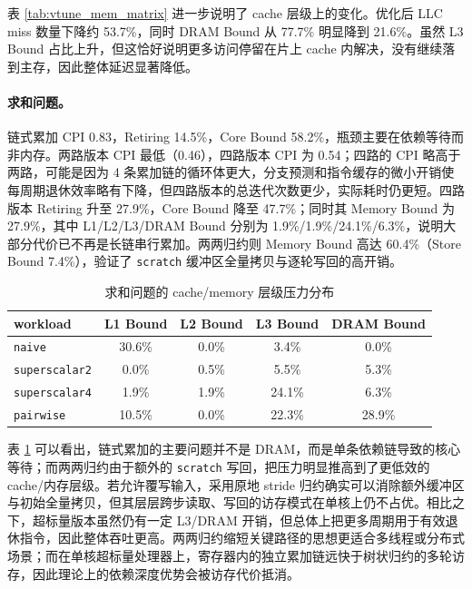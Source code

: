 \documentclass[a4paper,11pt,UTF8]{ctexart}
\begin{document}
表 \ref{tab:vtune_mem_matrix} 进一步说明了 cache 层级上的变化。优化后 LLC miss 数量下降约 53.7\%，同时 DRAM Bound 从 77.7\% 明显降到 21.6\%。虽然 L3 Bound 占比上升，但这恰好说明更多访问停留在片上 cache 内解决，没有继续落到主存，因此整体延迟显著降低。

\paragraph{求和问题。}
链式累加 CPI 0.83，Retiring 14.5\%，Core Bound 58.2\%，瓶颈主要在依赖等待而非内存。两路版本 CPI 最低（0.46），四路版本 CPI 为 0.54；四路的 CPI 略高于两路，可能是因为 4 条累加链的循环体更大，分支预测和指令缓存的微小开销使每周期退休效率略有下降，但四路版本的总迭代次数更少，实际耗时仍更短。四路版本 Retiring 升至 27.9\%，Core Bound 降至 47.7\%；同时其 Memory Bound 为 27.9\%，其中 L1/L2/L3/DRAM Bound 分别为 1.9\%/1.9\%/24.1\%/6.3\%，说明大部分代价已不再是长链串行累加。两两归约则 Memory Bound 高达 60.4\%（Store Bound 7.4\%），验证了 \texttt{scratch} 缓冲区全量拷贝与逐轮写回的高开销。

\begin{table}[H]
  \centering\scriptsize
  \begin{tabular}{lcccc}
    \toprule
    workload & L1 Bound & L2 Bound & L3 Bound & DRAM Bound \\
    \midrule
    \texttt{naive} & 30.6\% & 0.0\% & 3.4\% & 0.0\% \\
    \texttt{superscalar2} & 0.0\% & 0.5\% & 5.5\% & 5.3\% \\
    \texttt{superscalar4} & 1.9\% & 1.9\% & 24.1\% & 6.3\% \\
    \texttt{pairwise} & 10.5\% & 0.0\% & 22.3\% & 28.9\% \\
    \bottomrule
  \end{tabular}
  \caption{求和问题的 cache/memory 层级压力分布}
  \label{tab:vtune_mem_sum}
\end{table}

表 \ref{tab:vtune_mem_sum} 可以看出，链式累加的主要问题并不是 DRAM，而是单条依赖链导致的核心等待；而两两归约由于额外的 \texttt{scratch} 写回，把压力明显推高到了更低效的 cache/内存层级。若允许覆写输入，采用原地 stride 归约确实可以消除额外缓冲区与初始全量拷贝，但其层层跨步读取、写回的访存模式在单核上仍不占优。相比之下，超标量版本虽然仍有一定 L3/DRAM 开销，但总体上把更多周期用于有效退休指令，因此整体吞吐更高。两两归约缩短关键路径的思想更适合多线程或分布式场景；而在单核超标量处理器上，寄存器内的独立累加链远快于树状归约的多轮访存，因此理论上的依赖深度优势会被访存代价抵消。
\end{document}
